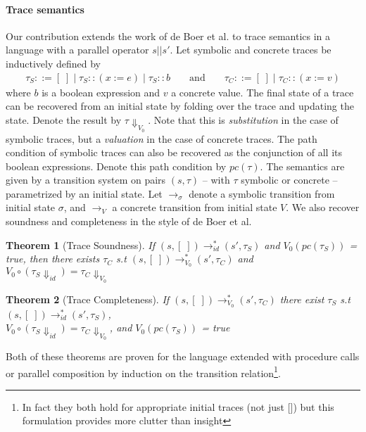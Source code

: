 \documentclass[submission,copyright,creativecommons]{eptcs}
\newtheorem{theorem}{Theorem}
\begin{document}
\paragraph{Trace semantics}
Our contribution extends the work of de Boer et al. to trace semantics in a language with a parallel operator $s |\!| s'$.
Let symbolic and concrete traces be inductively defined by
\begin{align*}
  \tau_{S} ::= [\;] \mid \tau_{S} :: (x := e) \mid \tau_{S} :: b
  && \mbox{ and } &&
  \tau_{C} ::= [\;] \mid \tau_{C} :: (x := v)
\end{align*}
where $b$ is a boolean expression and $v$ a concrete value.
The final state of a trace can be recovered from an initial state by folding over
the trace and updating the state. Denote the result by $\tau\Downarrow_{V_{0}}$. Note that this is \emph{substitution}
in the case of symbolic traces, but a \emph{valuation} in the case of concrete traces.
The path condition of symbolic traces can also be recovered as the conjunction of all its boolean expressions.
Denote this path condition by $pc(\tau)$.
The semantics are given by a transition system on pairs $(s, \tau)$ -- with $\tau$ symbolic or concrete --
parametrized by an initial state. Let $\rightarrow_{\sigma}$ denote a symbolic transition from initial state $\sigma$,
and $\rightarrow_{V}$ a concrete transition from initial state $V$.
We also recover soundness and completeness in the style of de Boer et al.
\begin{theorem}[Trace Soundness]
  If $(s, [\;]) \rightarrow_{id}^{*} (s', \tau_{S})$ and $V_{0}(pc(\tau_{S}))$ = true,
  then there exists $\tau_{C}$ s.t $(s, [\;]) \rightarrow_{V_0}^{*} (s', \tau_{C})$ and
    $V_{0} \circ (\tau_{S}\Downarrow_{id}) = \tau_{C}\Downarrow_{V_{0}}$
\end{theorem}

\begin{theorem}[Trace Completeness]
  If $(s, [\;]) \rightarrow_{V_{0}}^{*} (s', \tau_{C})$ there exist $\tau_{S}$ s.t
  $(s, [\;]) \rightarrow_{id}^{*} (s', \tau_{S})$,\\
  $V_{0} \circ (\tau_{S} \Downarrow_{id}) = \tau_{C}\Downarrow_{V_{0}}$, and $V_{0}(pc(\tau_{S}))$ = true
\end{theorem}
Both of these theorems are proven for the language extended with procedure calls or parallel composition
by induction on the transition relation\footnote{In fact they both hold for appropriate initial traces (not just [])
but this formulation provides more clutter than insight}.
\end{document}
